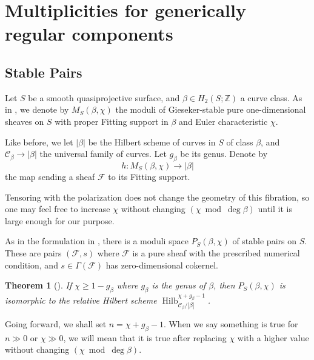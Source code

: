\documentclass{amsart}
\theoremstyle{plain}
\newtheorem{theorem}{Theorem}[section]
\theoremstyle{definition}
\theoremstyle{remark}
\begin{document}
\section{Multiplicities for generically regular components}\label{sec:gregmult}

\subsection{Stable Pairs}

Let $S$ be a smooth quasiprojective surface, and $\beta\in H_2(S;\mathbb Z)$ a curve class.
As in , we denote by $M_S(\beta,\chi)$ the moduli of Gieseker-stable pure one-dimensional sheaves on $S$ with proper Fitting support in $\beta$ and Euler characteristic $\chi$.

Like before, we let $|\beta|$ be the Hilbert scheme of curves in $S$ of class $\beta$, and $\mathcal C_{\beta}\to |\beta|$ the universal family of curves.
Let $g_{\beta}$ be its genus.
Denote by
\[h:M_S(\beta,\chi) \rightarrow |\beta|\]
the map sending a sheaf $\mathcal F$ to its Fitting support.

Tensoring with the polarization does not change the geometry of this fibration, so one may feel free to increase $\chi$ without changing $(\chi\bmod\deg\beta)$ until it is large enough for our purpose.

As in the formulation in \cite{PT}, there is a moduli space $P_S(\beta, \chi)$ of stable pairs on $S$.
These are pairs $(\mathcal F,s)$ where $\mathcal F$ is a pure sheaf with the prescribed numerical condition, and $s\in\Gamma(\mathcal F)$ has zero-dimensional cokernel.
\begin{theorem}[{\cite[Proposition B.8]{PT}}]
    If $\chi \ge 1-g_\beta$ where $g_\beta$ is the genus of $\beta$, then $P_S(\beta,\chi)$ is isomorphic to the relative Hilbert scheme $\operatorname{Hilb}^{\chi+g_\beta-1}_{\mathcal C_\beta/|\beta|}$.
\end{theorem}
Going forward, we shall set $n=\chi+g_\beta-1$.
When we say something is true for $n\gg0$ or $\chi\gg 0$, we will mean that it is true after replacing $\chi$ with a higher value without changing $(\chi\bmod\deg\beta)$.
\end{document}
